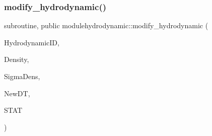 \subsubsection{\texorpdfstring{modify\+\_\+hydrodynamic()}{modify\_hydrodynamic()}}
{\footnotesize\ttfamily subroutine, public modulehydrodynamic\+::modify\+\_\+hydrodynamic (\begin{DoxyParamCaption}\item[{integer, intent(in)}]{Hydrodynamic\+ID,  }\item[{real, dimension(\+:,\+:,\+:), pointer}]{Density,  }\item[{real, dimension(\+:,\+:,\+:), pointer}]{Sigma\+Dens,  }\item[{type(t\+\_\+newdt), intent(out)}]{New\+DT,  }\item[{integer, intent(out), optional}]{S\+T\+AT }\end{DoxyParamCaption})}

